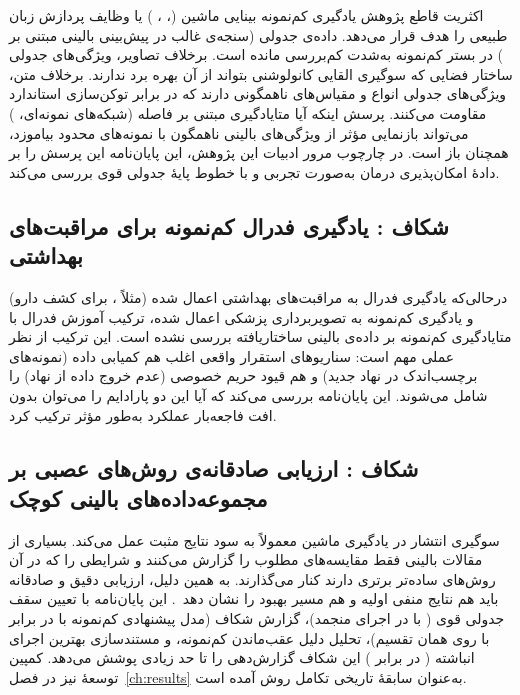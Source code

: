 اکثریت قاطع پژوهش یادگیری کم‌نمونه بینایی ماشین (، ، ) یا وظایف پردازش زبان طبیعی را هدف قرار می‌دهد. داده‌ی جدولی (سنجه‌ی غالب در پیش‌بینی بالینی مبتنی بر ) در بستر کم‌نمونه به‌شدت کم‌بررسی مانده است. برخلاف تصاویر، ویژگی‌های جدولی ساختار فضایی که سوگیری القایی کانولوشنی بتواند از آن بهره برد ندارند. برخلاف متن، ویژگی‌های جدولی انواع و مقیاس‌های ناهمگونی دارند که در برابر توکن‌سازی استاندارد مقاومت می‌کنند. پرسش اینکه آیا متایادگیری مبتنی بر فاصله (شبکه‌های نمونه‌ای، ) می‌تواند بازنمایی مؤثر از ویژگی‌های بالینی ناهمگون با نمونه‌های محدود بیاموزد، همچنان باز است. در چارچوب مرور ادبیات این پژوهش، این پایان‌نامه این پرسش را بر دادۀ امکان‌پذیری درمان  به‌صورت تجربی و با خطوط پایۀ جدولی قوی بررسی می‌کند.

\subsection{شکاف : یادگیری فدرال کم‌نمونه برای مراقبت‌های بهداشتی}

درحالی‌که یادگیری فدرال به مراقبت‌های بهداشتی اعمال شده (مثلاً ،  برای کشف دارو) و یادگیری کم‌نمونه به تصویربرداری پزشکی اعمال شده، ترکیب آموزش فدرال با متایادگیری کم‌نمونه بر داده‌ی بالینی ساختاریافته بررسی نشده است. این ترکیب از نظر عملی مهم است: سناریوهای استقرار واقعی اغلب هم کمیابی داده (نمونه‌های برچسب‌اندک در نهاد جدید) و هم قیود حریم خصوصی (عدم خروج داده از نهاد) را شامل می‌شوند. این پایان‌نامه بررسی می‌کند که آیا این دو پارادایم را می‌توان بدون افت فاجعه‌بار عملکرد به‌طور مؤثر ترکیب کرد.

\subsection{شکاف : ارزیابی صادقانه‌ی روش‌های عصبی بر مجموعه‌داده‌های بالینی کوچک}

سوگیری انتشار در یادگیری ماشین معمولاً به سود نتایج مثبت عمل می‌کند. بسیاری از مقالات  بالینی فقط مقایسه‌های مطلوب را گزارش می‌کنند و شرایطی را که در آن روش‌های ساده‌تر برتری دارند کنار می‌گذارند. به همین دلیل، ارزیابی دقیق و صادقانه باید هم نتایج منفی اولیه و هم مسیر بهبود را نشان دهد~\cite{makel2012replications}. این پایان‌نامه با تعیین سقف جدولی قوی ( با  \textbf{} در اجرای منجمد)، گزارش شکاف  (مدل پیشنهادی کم‌نمونه با \textbf{} در برابر  با \textbf{} روی همان تقسیم)، تحلیل دلیل عقب‌ماندن کم‌نمونه، و مستندسازی بهترین اجرای انباشته (\textbf{} در برابر \textbf{}) این شکاف گزارش‌دهی را تا حد زیادی پوشش می‌دهد. کمپین توسعۀ  نیز در فصل~\ref{ch:results} به‌عنوان سابقۀ تاریخی تکامل روش آمده است.

